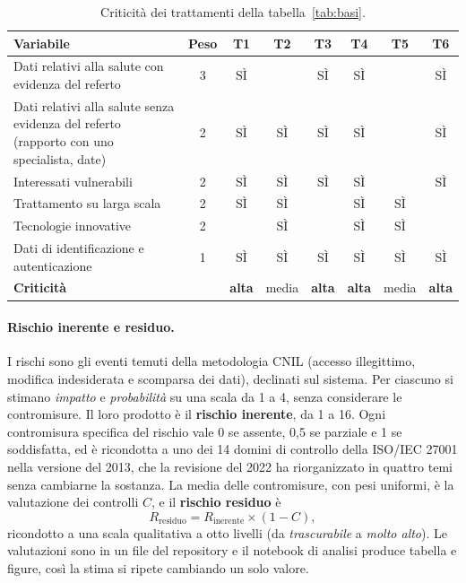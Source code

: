 \begin{table}[H]
\centering\footnotesize
\renewcommand{\arraystretch}{1.15}
\begin{tabular}{@{}p{} c cccccc@{}}
\toprule
Variabile & Peso & T1 & T2 & T3 & T4 & T5 & T6\\
\midrule
Dati relativi alla salute con evidenza del referto & 3 & SÌ & & SÌ & SÌ & & SÌ\\
Dati relativi alla salute senza evidenza del referto (rapporto con uno specialista, date) & 2 & SÌ & SÌ & SÌ & SÌ & & SÌ\\
Interessati vulnerabili & 2 & SÌ & SÌ & SÌ & SÌ & & SÌ\\
Trattamento su larga scala & 2 & SÌ & SÌ & & SÌ & SÌ & \\
Tecnologie innovative & 2 & & SÌ & & SÌ & SÌ & \\
Dati di identificazione e autenticazione & 1 & SÌ & SÌ & SÌ & SÌ & SÌ & SÌ\\
\midrule
\textbf{Criticità} & & \textbf{alta} & media & \textbf{alta} & \textbf{alta} & media & \textbf{alta}\\
\bottomrule
\end{tabular}
\caption{Criticità dei trattamenti della tabella~\ref{tab:basi}.}\label{tab:criticita}
\end{table}

\paragraph{Rischio inerente e residuo.} I rischi sono gli eventi temuti della metodologia CNIL (accesso illegittimo, modifica indesiderata e scomparsa dei dati), declinati sul sistema. Per ciascuno si stimano \emph{impatto} e \emph{probabilità} su una scala da 1 a 4, senza considerare le contromisure. Il loro prodotto è il \textbf{rischio inerente}, da 1 a 16. Ogni contromisura specifica del rischio vale 0 se assente, 0,5 se parziale e 1 se soddisfatta, ed è ricondotta a uno dei 14 domini di controllo della ISO/IEC 27001\cite{iso27001} nella versione del 2013, che la revisione del 2022 ha riorganizzato in quattro temi senza cambiarne la sostanza. La media delle contromisure, con pesi uniformi, è la valutazione dei controlli $C$, e il \textbf{rischio residuo} è
\[
R_{\mathrm{residuo}} = R_{\mathrm{inerente}} \times (1 - C),
\]
ricondotto a una scala qualitativa a otto livelli (da \emph{trascurabile} a \emph{molto alto}). Le valutazioni sono in un file del repository e il notebook di analisi produce tabella e figure, così la stima si ripete cambiando un solo valore.

